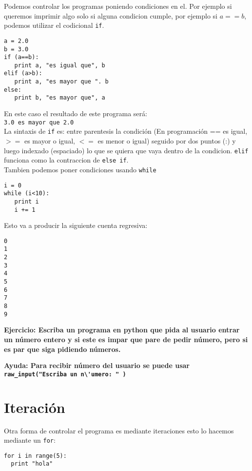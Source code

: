 \documentclass[12pt]{article}
\begin{document}
Podemos controlar los programas poniendo condiciones en el. Por ejemplo si queremos imprimir algo 
solo si alguna condicion cumple, por ejemplo si $a == b$, podemos utilizar el codicional \verb+if+.

\begin{verbatim}
a = 2.0
b = 3.0
if (a==b):
   print a, "es igual que", b
elif (a>b):
   print a, "es mayor que ". b
else:
   print b, "es mayor que", a
\end{verbatim}

En este caso el resultado de este programa ser\'a:\\

\verb"3.0 es mayor que 2.0"\\

La sintaxis de \verb"if" es: entre parentesis la condici\'on (En programaci\'on == es igual, $>= $ es mayor o igual, $<=$ es menor o igual)
seguido por dos puntos (:) y luego indexado (espaciado) lo que se quiera que vaya dentro de la condicion. \verb"elif" funciona como la contraccion 
de \verb"else if". \\

Tambien podemos poner condiciones usando \verb"while"

\begin{verbatim}
i = 0
while (i<10):
   print i
   i += 1
\end{verbatim}

Esto va a producir la siguiente cuenta regresiva:

\begin{verbatim}
0
1
2
3
4
5
6
7
8
9
\end{verbatim}

{\bf Ejercicio: Escriba un programa en python que pida al usuario entrar un n\'umero entero 
y si este es impar que pare de pedir n\'umero, pero si es par que siga pidiendo n\'umeros.}

{\bf Ayuda: Para recibir n\'umero del usuario se puede usar \verb+raw_input("Escriba un n\'umero: " )+} 


\section{Iteraci\'on}

Otra forma de controlar el programa es mediante iteraciones esto lo hacemos mediante un \verb"for":\\

\begin{verbatim}
for i in range(5):
  print "hola"
\end{verbatim}
\end{document}
